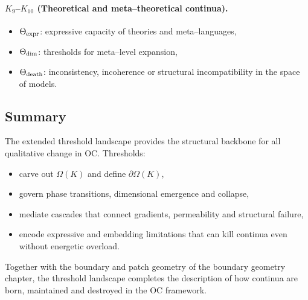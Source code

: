 \paragraph{\texorpdfstring{\(K_9\)}{K_9}–\(K_{10}\) (Theoretical and meta–theoretical continua).}
\begin{itemize}
    \item \(\Theta_{\rm expr}\): expressive capacity of theories and
          meta–languages,
    \item \(\Theta_{\rm dim}\): thresholds for meta–level expansion,
    \item \(\Theta_{\rm death}\): inconsistency, incoherence or structural
          incompatibility in the space of models.
\end{itemize}

\subsection{Summary}

The extended threshold landscape provides the structural backbone for all
qualitative change in OC. Thresholds:
\begin{itemize}
    \item carve out \(\Omega(K)\) and define \(\partial\Omega(K)\),
    \item govern phase transitions, dimensional emergence and collapse,
    \item mediate cascades that connect gradients, permeability and structural
          failure,
    \item encode expressive and embedding limitations that can kill continua
          even without energetic overload.
\end{itemize}

Together with the boundary and patch geometry of
the boundary geometry chapter, the threshold landscape completes the
description of how continua are born, maintained and destroyed in the OC
framework.
